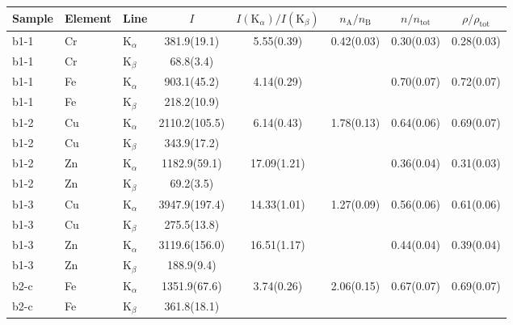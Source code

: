 \documentclass[11pt,a4paper,twoside,onecolumn]{article}
\newcommand{\Kalpha}{$\mathrm{K}_\alpha$~}
\newcommand{\Kbeta}{$\mathrm{K}_\beta$~}
\begin{document}
\begin{table}[!htbp]
\centering
{}
\begin{tabular}{@{}
    lll
    S[table-figures-decimal = 2, round-precision=1]
    S[table-figures-decimal = 2, round-precision=2]
    S[table-figures-decimal = 2, round-precision=2]
    S[table-figures-decimal = 2, round-precision=2]
    S[table-figures-decimal = 2, round-precision=2]
    @{}
    }
\toprule
Sample & Element & Line & {$I$} & {$I(\mathrm{K}_\alpha) / I(\mathrm{K}_\beta)$} & {$n_\mathrm{A} / n_\mathrm{B}$} & {$n / n_\mathrm{tot}$} & {$\rho / \rho_\mathrm{tot}$} \\ \midrule
b1-1 & Cr & \Kalpha & 381.9(19.1)   & 5.55(0.39)  & 0.42(0.03) & 0.30(0.03) & 0.28(0.03) \\
b1-1 & Cr & \Kbeta  & 68.8(3.4)     &             &            &            &            \\
b1-1 & Fe & \Kalpha & 903.1(45.2)   & 4.14(0.29)  &            & 0.70(0.07) & 0.72(0.07) \\
b1-1 & Fe & \Kbeta  & 218.2(10.9)   &             &            &            &            \\ \midrule
b1-2 & Cu & \Kalpha & 2110.2(105.5) & 6.14(0.43)  & 1.78(0.13) & 0.64(0.06) & 0.69(0.07) \\
b1-2 & Cu & \Kbeta  & 343.9(17.2)   &             &            &            &            \\
b1-2 & Zn & \Kalpha & 1182.9(59.1)  & 17.09(1.21) &            & 0.36(0.04) & 0.31(0.03) \\
b1-2 & Zn & \Kbeta  & 69.2(3.5)     &             &            &            &            \\ \midrule
b1-3 & Cu & \Kalpha & 3947.9(197.4) & 14.33(1.01) & 1.27(0.09) & 0.56(0.06) & 0.61(0.06) \\
b1-3 & Cu & \Kbeta  & 275.5(13.8)   &             &            &            &            \\
b1-3 & Zn & \Kalpha & 3119.6(156.0) & 16.51(1.17) &            & 0.44(0.04) & 0.39(0.04) \\
b1-3 & Zn & \Kbeta  & 188.9(9.4)    &             &            &            &            \\ \midrule
b2-c & Fe & \Kalpha & 1351.9(67.6)  & 3.74(0.26)  & 2.06(0.15) & 0.67(0.07) & 0.69(0.07) \\
b2-c & Fe & \Kbeta  & 361.8(18.1)   &             &            &            &            \\

\end{tabular}
\end{table}
\end{document}
